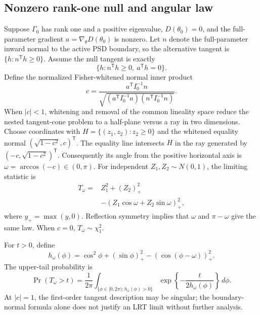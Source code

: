 \subsection{Nonzero rank-one null and angular law}
\label{subsec:eq_rankone}
Suppose $\Gamma_0$ has rank one and a positive eigenvalue,
$D(\theta_0)=0$, and the full-parameter gradient
$a=\nabla_\theta D(\theta_0)$ is nonzero. Let $n$ denote the
full-parameter inward normal to the active PSD boundary,
so the alternative tangent is $\{h:n^{\mathsf T}h\ge0\}$.
Assume the null tangent is exactly
\begin{equation}\label{eq:eq_rankone_tangent}
 \{h:n^{\mathsf T}h\ge0,\ a^{\mathsf T}h=0\}.
\end{equation}
Define the normalized Fisher-whitened normal inner product
\begin{equation}\label{eq:eq_angle}
 c=\frac{a^{\mathsf T}I_0^{-1}n}
 {\sqrt{(a^{\mathsf T}I_0^{-1}a)
             (n^{\mathsf T}I_0^{-1}n)}}.
\end{equation}
When $|c|<1$, whitening and removal of the common lineality
space reduce the nested tangent-cone problem to a half-plane
versus a ray in two dimensions. Choose coordinates with
$H=\{(z_1,z_2):z_2\ge0\}$ and the whitened equality normal
$(\sqrt{1-c^2},c)^{\mathsf T}$. The equality line intersects
$H$ in the ray generated by
$(-c,\sqrt{1-c^2})^{\mathsf T}$.
Consequently its angle from the positive horizontal axis is
$\omega=\arccos(-c)\in(0,\pi)$.
For independent $Z_1,Z_2\sim N(0,1)$, the limiting statistic is
\begin{equation}\label{eq:eq_angular_law}
\begin{aligned}
 T_\omega={}&Z_1^2+(Z_2)_+^2\\
 &-(Z_1\cos\omega+Z_2\sin\omega)_+^2,
\end{aligned}
\end{equation}
where $y_+=\max(y,0)$. Reflection symmetry implies that
$\omega$ and $\pi-\omega$ give the same law. When $c=0$,
$T_\omega\sim\chi_1^2$.

For $t>0$, define
\begin{equation}\label{eq:eq_homega}
 h_\omega(\phi)=\cos^2\phi+(\sin\phi)_+^2
                  -(\cos(\phi-\omega))_+^2.
\end{equation}
The upper-tail probability is
\begin{equation}\label{eq:eq_angular_tail}
 \Pr(T_\omega>t)=\frac1{2\pi}
 \int_{\{\phi\in[0,2\pi):h_\omega(\phi)>0\}}
 \exp\!\left\{-\frac{t}{2h_\omega(\phi)}\right\}
 \,d\phi.
\end{equation}
At $|c|=1$, the first-order tangent description may be
singular; the boundary-normal formula alone does not justify
an LRT limit without further analysis.

